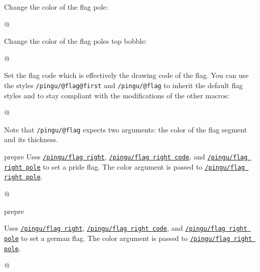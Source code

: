 \documentclass[parskip=half,english,numbers=noenddot,footnotes=nomultiple,oneside]{scrartcl}
\makeatletter
\def\lpingu#1{\lstinline[style=lstpingu,language=pingulang]'#1'}
\def\@showcase@pre{pre}
\let\@showcase@cur\@showcase@pre
\def\@toggle@showcase{\ifx\@showcase@cur\@showcase@pre\global\let\@showcase@cur\@empty\else \global\let\@showcase@cur\@showcase@pre\fi}
\newcommand*\keyref[2][/pingu/]{\hyperref[pk:#1#2]{\lpingu{#1#2}}}
\makeatother
\begin{document}
Change the color of the flag pole:
	\begin{tcblisting}{@}
\begin{tikzpicture}
	\pingu[flag right, flag right pole=green]
\end{tikzpicture}
\end{tcblisting}
\endsubkeyexplain

Change the color of the flag poles top bobble:
	\begin{tcblisting}{@}
\begin{tikzpicture}
	\pingu[flag right, flag right bobble=green]
\end{tikzpicture}
\end{tcblisting}
\endsubkeyexplain

Set the flag code which is effectively the drawing code of the flag.
You can use the styles \lpingu{/pingu/@flag@first} and \lpingu{/pingu/@flag} to inherit the default flag styles and to stay compliant with the modifications of the other macros:
	\begin{tcblisting}{@}
\begin{tikzpicture}
	\pingu[flag right, flag right code={
	  \node[/pingu/@flag@first,
	  	/pingu/@flag={blue}{5mm}]
	  		(upper) at (0,0) {};
	  \node[below,/pingu/@flag={black}{4mm}]
	  	(lower) at (upper.south) {};
	}]
\end{tikzpicture}
\end{tcblisting}
Note that \lpingu{/pingu/@flag} expects two arguments: the color of the flag segment and its thickness.
\endsubkeyexplain

\@toggle@showcase %
	Uses \keyref{flag right}, \keyref{flag right code}, and \keyref{flag right pole} to set a pride flag. The color argument is passed to \keyref{flag right pole}.
\begin{tcblisting}{@}
\begin{tikzpicture}
	\pingu[pride flag right=green]
\end{tikzpicture}
\end{tcblisting}
\endshowkeyexplain
\@toggle@showcase

	Uses \keyref{flag right}, \keyref{flag right code}, and \keyref{flag right pole} to set a german flag. The color argument is passed to \keyref{flag right pole}.
\begin{tcblisting}{@}
\begin{tikzpicture}
	\pingu[german flag right=green]
\end{tikzpicture}
\end{tcblisting}
\endshowkeyexplain
\end{document}
